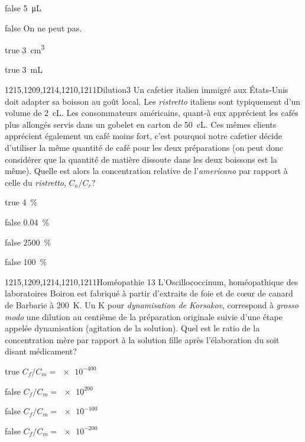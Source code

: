 			\begin{reponses} 
				\item[false] \SI{5}{\micro\liter}
				\item[false] On ne peut pas.
				\item[true] \SI{3}{\centi\meter\cubed}
				\item[true] \SI{3}{\milli\liter}
			\end{reponses}
			\begin{question}{1215,1209,1214,1210,1211}{Dilution}{3}{}
			Un cafetier italien immigré aux États-Unis doit adapter sa boisson au goût local. Les \textit{ristretto} italiens sont typiquement d'un volume de \SI{2}{\centi\liter}. Les consommateurs américains, quant-à eux apprécient les cafés plus allongés servis dans un gobelet en carton de \SI{50}{\centi\liter}. Ces mêmes clients apprécient également un café moins fort, c'est pourquoi notre cafetier décide d'utiliser la même quantité de café pour les deux préparations (on peut donc considérer que la quantité de matière dissoute dans les deux boissons est la même). Quelle est alors la concentration relative de l'\textit{americano} par rapport à celle du \textit{ristretto}, $C_a/C_r$?
			\end{question}
			\begin{reponses} 
				\item[true] \SI{4}{\percent}
				\item[false] \SI{0.04}{\percent}
				\item[false] \SI{2500}{\percent}
					\item[false] \SI{100}{\percent}
			\end{reponses}
			\begin{question}{1215,1209,1214,1210,1211}{Homéopathie 1}{3}{}
				L'Oscillococcinum,  homéopathique des laboratoires Boiron est fabriqué à partir d'extraits de foie et de c\oe{}ur de canard de Barbarie à \SI{200}{K}. Un \si{K} pour \textit{dynamisation de Korsakov}, correspond à \textit{grosso modo} une dilution au centième de la préparation originale suivie d'une étape appelée dynamisation (agitation de la solution). Quel est le ratio de la concentration mère par rapport à la solution fille après l'élaboration du soit disant médicament?
			\end{question}
			\begin{reponses} 
				\item[true] $C_f/C_m = \num{e-400}$
				\item[false] $C_f/C_m = \num{e200}$
				\item[false] $C_f/C_m = \num{e-100}$
				\item[false] $C_f/C_m = \num{e-200}$
			\end{reponses}
